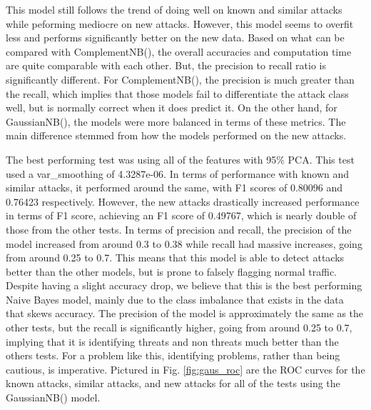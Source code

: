 \documentclass[journal]{IEEEtran}
\begin{document}


This model still follows the trend of doing well on known and similar attacks while peforming mediocre on new attacks. However, this model seems to overfit less and performs significantly better on the new data. Based on what can be compared with ComplementNB(), the overall accuracies and computation time are quite comparable with each other. But, the precision to recall ratio is significantly different. For ComplementNB(), the precision is much greater than the recall, which implies that those models fail to differentiate the attack class well, but is normally correct when it does predict it. On the other hand, for GaussianNB(), the models were more balanced in terms of these metrics. The main difference stemmed from how the models performed on the new attacks.

The best performing test was using all of the features with 95\% PCA. This test used a var\_smoothing of 4.3287e-06. In terms of performance with known and similar attacks, it performed around the same, with F1 scores of 0.80096 and 0.76423 respectively. However, the new attacks drastically increased performance in terms of F1 score, achieving an F1 score of 0.49767, which is nearly double of those from the other tests. In terms of precision and recall, the precision of the model increased from around 0.3 to 0.38 while recall had massive increases, going from around 0.25 to 0.7. This means that this model is able to detect attacks better than the other models, but is prone to falsely flagging normal traffic. Despite having a slight accuracy drop, we believe that this is the best performing Naive Bayes model, mainly due to the class imbalance that exists in the data that skews accuracy. The precision of the model is approximately the same as the other tests, but the recall is significantly higher, going from around 0.25 to 0.7, implying that it is identifying threats and non threats much better than the others tests. For a problem like this, identifying problems, rather than being cautious, is imperative. Pictured in Fig. \ref{fig:gaus_roc} are the ROC curves for the known attacks, similar attacks, and new attacks for all of the tests using the GaussianNB() model. 
\end{document}
